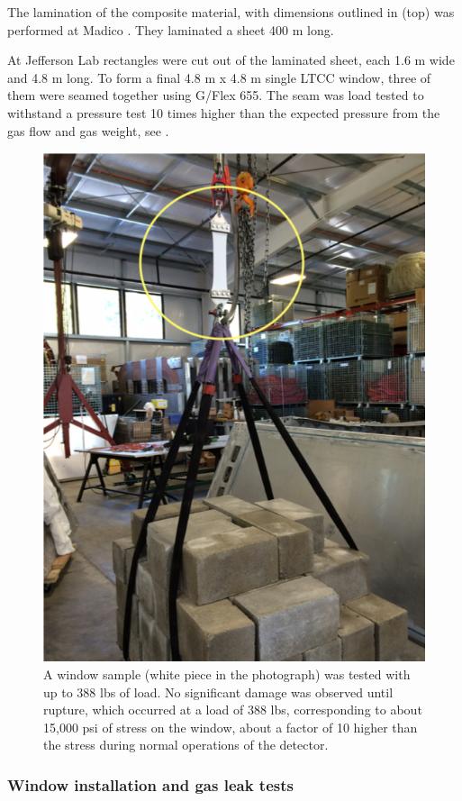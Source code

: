 The lamination of the composite material, with dimensions outlined in  (top) was performed
at Madico \cite{madico}. They laminated a sheet 400 m long.

At Jefferson Lab rectangles were cut out of the laminated sheet, each 1.6 m wide and 4.8 m long.
To form a final 4.8 m x 4.8 m single LTCC window, three of them were seamed together using G/Flex 655.
The seam was load tested to withstand a pressure test 10 times
higher than the expected pressure from the gas flow and gas weight, see .


\begin{figure}
	\centering
	\includegraphics[width=1.0\columnwidth, height=1.0\columnwidth]{img/windowTest.png}
	\caption{A window sample (white piece in the photograph) was tested with up to 388 lbs of load.
             No significant damage was observed until rupture, which occurred at a load of 388 lbs,
			 corresponding to about 15,000 psi of stress on the window, about a factor of 10 higher than the stress during normal operations of the detector.}
	\label{fig:windowTest}
\end{figure}

\subsubsection{Window installation and gas leak tests}

